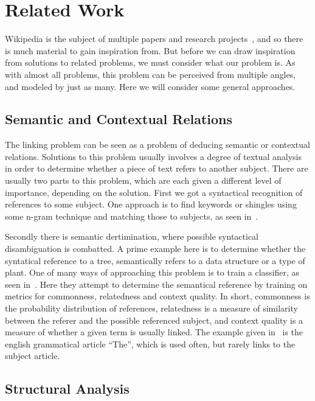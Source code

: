 \section{Related Work}\label{sec:related_work}

Wikipedia is the subject of multiple papers and research projects~\cite{wiki-research-newsletter}, and so there is much material to gain inspiration from. But before we can draw inspiration from solutions to related problems, we must consider what our problem is. As with almost all problems, this problem can be perceived from multiple angles, and modeled by just as many. Here we will consider some general approaches.

\subsection{Semantic and Contextual Relations}\label{related_semantic_contextual}

The linking problem can be seen as a problem of deducing semantic or contextual relations. Solutions to this problem usually involves a degree of textual analysis in order to determine whether a piece of text refers to another subject. There are usually two parts to this problem, which are each given a different level of importance, depending on the solution. First we got a syntactical recognition of references to some subject. One approach is to find keywords or shingles using some n-gram technique and matching those to subjects, as seen in~\cite{mihalcea2007wikify}. 

Secondly there is semantic dertimination, where possible syntactical disambiguation is combatted. A prime example here is to determine whether the syntatical reference to a tree, semantically refers to a data structure or a type of plant. One of many ways of approaching this problem is to train a classifier, as seen in~\cite{milne2008learning}. Here they attempt to determine the semantical reference by training on metrics for commonness, relatedness and context quality. In short, commonness is the probability distribution of references, relatedness is a measure of similarity between the referer and the possible referenced subject, and context quality is a measure of whether a given term is usually linked. The example given in~\cite{milne2008learning} is the english grammatical article \enquote{The}, which is used often, but rarely links to the subject article.

\subsection{Structural Analysis}\label{related_structural_analysis}

